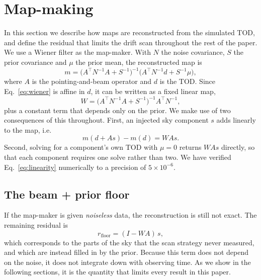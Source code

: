 \documentclass[a4paper,fleqn,usenatbib]{mnras}
\begin{document}
\section{Map-making}
\label{sec:mapmaking}

In this section we describe how maps are reconstructed from the simulated TOD,
and define the residual that limits the drift scan throughout the rest of the
paper. We use a Wiener filter as the map-maker.
With $N$ the noise covariance, $S$ the prior covariance and $\mu$ the prior
mean, the reconstructed map is
\begin{equation}
  m = \bigl(A^{\top} N^{-1} A + S^{-1}\bigr)^{-1}
      \bigl(A^{\top} N^{-1} d + S^{-1}\mu\bigr),
  \label{eq:wiener}
\end{equation}
where $A$ is the pointing-and-beam operator and $d$ is the TOD. Since
Eq.~\eqref{eq:wiener} is affine in $d$, it can be written as a fixed linear map,
\begin{equation}
  W = \bigl(A^{\top}N^{-1}A + S^{-1}\bigr)^{-1}A^{\top}N^{-1},
  \label{eq:W}
\end{equation}
plus a constant term that depends only on the prior. We make use of two
consequences of this throughout. First, an injected sky component $s$ adds
linearly to the map, i.e.
\begin{equation}
  m(d + A s) - m(d) = W A s.
  \label{eq:linearity}
\end{equation}
Second, solving for a component's own TOD with $\mu = 0$ returns $WAs$
directly, so that each component requires one solve rather than two. We have
verified Eq.~\eqref{eq:linearity} numerically to a precision of
$5\times10^{-6}$.

\subsection{The beam + prior floor}
\label{sec:floor}

If the map-maker is given \emph{noiseless} data, the reconstruction is still
not exact. The remaining residual is
\begin{equation}
  r_{\mathrm{floor}} = (I - WA)\,s,
  \label{eq:floor}
\end{equation}
which corresponds to the parts of the sky that the scan strategy never
measured, and which are instead filled in by the prior. Because this term does
not depend on the noise, it does not integrate down with observing time. As we
show in the following sections, it is the quantity that limits every result
in this paper.
\end{document}
